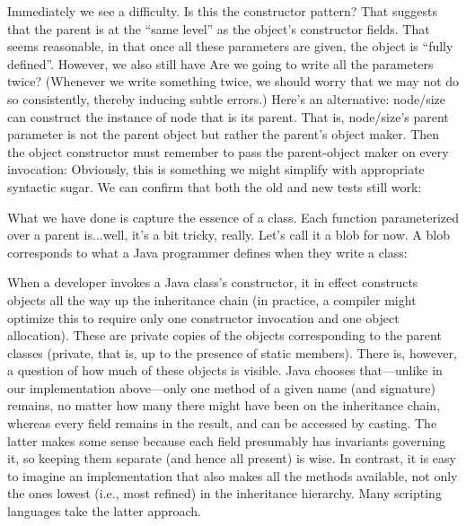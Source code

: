 
Immediately we see a difficulty. Is this the constructor pattern?
That suggests that the parent is at the “same level” as the object’s constructor
fields. That seems reasonable, in that once all these parameters are given, the
object is “fully defined”. However, we also still have
Are we going to write all the parameters twice? (Whenever we write something
twice, we should worry that we may not do so consistently, thereby inducing
subtle errors.) Here’s an alternative: node/size can construct the instance of
node that is its parent. That is, node/size’s parent parameter is not the parent
object but rather the parent’s object maker.
Then the object constructor must remember to pass the parent-object maker on
every invocation:
Obviously, this is something we might simplify with appropriate syntactic sugar.
We can confirm that both the old and new tests still work:


What we have done is capture the essence of a class. Each function parameterized
over a parent is...well, it’s a bit tricky, really. Let’s call it a blob for
now. A blob corresponds to what a Java programmer defines when they write a
class:


When a developer invokes a Java class’s constructor, it in effect constructs
objects all the way up the inheritance chain (in practice, a compiler might
optimize this to require only one constructor invocation and one object
allocation). These are private copies of the objects corresponding to the parent
classes (private, that is, up to the presence of static members). There is,
however, a question of how much of these objects is visible. Java chooses
that—unlike in our implementation above—only one method of a given name (and
signature) remains, no matter how many there might have been on the inheritance
chain, whereas every field remains in the result, and can be accessed by
casting. The latter makes some sense because each field presumably has
invariants governing it, so keeping them separate (and hence all present) is
wise. In contrast, it is easy to imagine an implementation that also makes all
the methods available, not only the ones lowest (i.e., most refined) in the
inheritance hierarchy. Many scripting languages take the latter approach.

